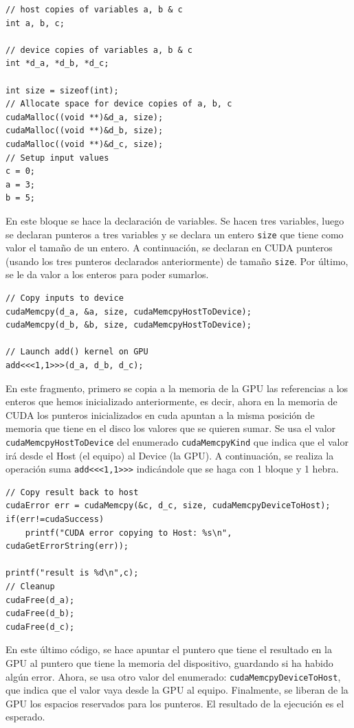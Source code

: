 \documentclass[11pt]{article}
\def\inline{\lstinline[basicstyle=\ttfamily,keywordstyle={}]}
\begin{document}
\begin{verbatim}
// host copies of variables a, b & c
int a, b, c;

// device copies of variables a, b & c  
int *d_a, *d_b, *d_c;

int size = sizeof(int);
// Allocate space for device copies of a, b, c
cudaMalloc((void **)&d_a, size);
cudaMalloc((void **)&d_b, size);
cudaMalloc((void **)&d_c, size);
// Setup input values  
c = 0;
a = 3;
b = 5;
\end{verbatim}
En este bloque se hace la declaración de variables. Se hacen tres variables, luego se declaran punteros a tres variables y se declara un entero \inline{size} que tiene como valor el tamaño de un entero. A continuación, se declaran en CUDA punteros (usando los tres punteros declarados anteriormente) de tamaño \inline{size}. Por último, se le da valor a los enteros para poder sumarlos.

\begin{verbatim}
// Copy inputs to device
cudaMemcpy(d_a, &a, size, cudaMemcpyHostToDevice);
cudaMemcpy(d_b, &b, size, cudaMemcpyHostToDevice);

// Launch add() kernel on GPU
add<<<1,1>>>(d_a, d_b, d_c);  
\end{verbatim}
En este fragmento, primero se copia a la memoria de la GPU las referencias a los enteros que hemos inicializado anteriormente, es decir, ahora en la memoria de CUDA los punteros inicializados en cuda apuntan a la misma posición de memoria que tiene en el disco los valores que se quieren sumar. Se usa el valor \inline{cudaMemcpyHostToDevice} del enumerado \inline{cudaMemcpyKind} que indica que el valor irá desde el Host (el equipo) al Device (la GPU). A continuación, se realiza la operación suma \inline{add<<<1,1>>>} indicándole que se haga con 1 bloque y 1 hebra. 

\begin{verbatim}
// Copy result back to host
cudaError err = cudaMemcpy(&c, d_c, size, cudaMemcpyDeviceToHost);
if(err!=cudaSuccess) 
	printf("CUDA error copying to Host: %s\n", cudaGetErrorString(err));

printf("result is %d\n",c);
// Cleanup
cudaFree(d_a);
cudaFree(d_b);
cudaFree(d_c);
\end{verbatim}

En este último código, se hace apuntar el puntero que tiene el resultado en la GPU al puntero que tiene la memoria del dispositivo, guardando si ha habido algún error. Ahora, se usa otro valor del enumerado: \inline{cudaMemcpyDeviceToHost}, que indica que el valor vaya desde la GPU al equipo. Finalmente, se liberan de la GPU los espacios reservados para los punteros. El resultado de la ejecución es el esperado.
\end{document}

